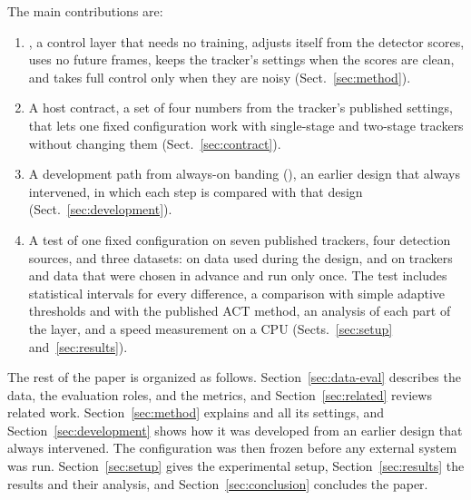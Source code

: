 The main contributions are:
\begin{enumerate}
\item \scl{}, a control layer that needs no training, adjusts itself from the
      detector scores, uses no future frames, keeps the tracker's settings
      when the scores are clean, and takes full control only when they are
      noisy (Sect.~\ref{sec:method}).
\item A host contract, a set of four numbers from the tracker's published
      settings, that lets one fixed configuration work with single-stage and
      two-stage trackers without changing them (Sect.~\ref{sec:contract}).
\item A development path from always-on banding (\aob{}), an earlier design
      that always intervened, in which each step is compared with that
      design (Sect.~\ref{sec:development}).
\item A test of one fixed configuration on seven published trackers, four
      detection sources, and three datasets: on data used during the design,
      and on trackers and data that were chosen in advance and run only once.
      The test includes statistical intervals for every difference, a
      comparison with simple adaptive thresholds and with the published ACT
      method, an analysis of each part of the layer, and a speed measurement
      on a CPU (Sects.~\ref{sec:setup} and~\ref{sec:results}).
\end{enumerate}

The rest of the paper is organized as follows. Section~\ref{sec:data-eval}
describes the data, the evaluation roles, and the metrics, and
Section~\ref{sec:related} reviews related work. Section~\ref{sec:method}
explains \scl{} and all its settings, and Section~\ref{sec:development} shows
how it was developed from an earlier design that always intervened. The
configuration was then frozen before any external system was run.
Section~\ref{sec:setup} gives the experimental setup,
Section~\ref{sec:results} the results and their analysis, and
Section~\ref{sec:conclusion} concludes the paper.

